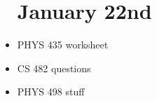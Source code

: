 \documentclass{report}
\begin{document}
\begin{itemize}
\chapter{January 22nd}
\item
PHYS 435 worksheet 
\item 
CS 482 questions 
\item 
PHYS 498 stuff 



\end{itemize}
\end{document}

